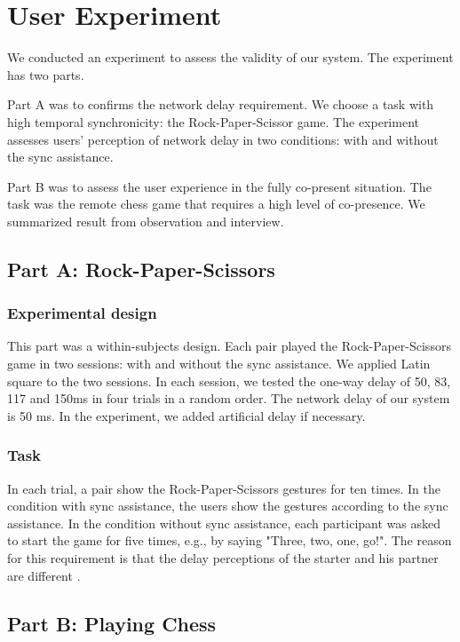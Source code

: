\section{User Experiment}

We conducted an experiment to assess the validity of our system. The experiment has two parts.

Part A was to confirms the network delay requirement. We choose a task with high temporal synchronicity: the Rock-Paper-Scissor game. The experiment assesses users' perception of network delay in two conditions: with and without the sync assistance. 

Part B was to assess the user experience in the fully co-present situation. The task was the remote chess game that requires a high level of co-presence. We summarized result from observation and interview.

\subsection{Part A: Rock-Paper-Scissors}

\subsubsection{Experimental design}

This part was a within-subjects design. Each pair played the Rock-Paper-Scissors game in two sessions: with and without the sync assistance. We applied Latin square to the two sessions. In each session, we tested the one-way delay of 50, 83, 117 and 150ms in four trials in a random order. The network delay of our system is 50 ms. In the experiment, we added artificial delay if necessary.

\subsubsection{Task}

In each trial, a pair show the Rock-Paper-Scissors gestures for ten times. In the condition with sync assistance, the users show the gestures according to the sync assistance. In the condition without sync assistance, each participant was asked to start the game for five times, e.g., by saying "Three, two, one, go!". The reason for this requirement is that the delay perceptions of the starter and his partner are different \cite{hashimoto2006influences}.

\subsection{Part B: Playing Chess}

